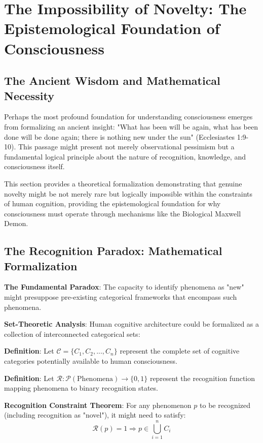 \documentclass[12pt]{article}
\begin{document}
\section{The Impossibility of Novelty: The Epistemological Foundation of Consciousness}

\subsection{The Ancient Wisdom and Mathematical Necessity}

Perhaps the most profound foundation for understanding consciousness emerges from formalizing an ancient insight: "What has been will be again, what has been done will be done again; there is nothing new under the sun" (Ecclesiastes 1:9-10). This passage might present not merely observational pessimism but a fundamental logical principle about the nature of recognition, knowledge, and consciousness itself.

This section provides a theoretical formalization demonstrating that genuine novelty might be not merely rare but logically impossible within the constraints of human cognition, providing the epistemological foundation for why consciousness must operate through mechanisms like the Biological Maxwell Demon.

\subsection{The Recognition Paradox: Mathematical Formalization}

\textbf{The Fundamental Paradox}: The capacity to identify phenomena as "new" might presuppose pre-existing categorical frameworks that encompass such phenomena.

\textbf{Set-Theoretic Analysis}: Human cognitive architecture could be formalized as a collection of interconnected categorical sets:

\textbf{Definition}: Let $\mathcal{C} = \{C_1, C_2, ..., C_n\}$ represent the complete set of cognitive categories potentially available to human consciousness.

\textbf{Definition}: Let $\mathcal{R}: \mathcal{P}(\text{Phenomena}) \rightarrow \{0,1\}$ represent the recognition function mapping phenomena to binary recognition states.

\textbf{Recognition Constraint Theorem}: For any phenomenon $p$ to be recognized (including recognition as "novel"), it might need to satisfy:
$$\mathcal{R}(p) = 1 \Rightarrow p \in \bigcup_{i=1}^{n} C_i$$
\end{document}
